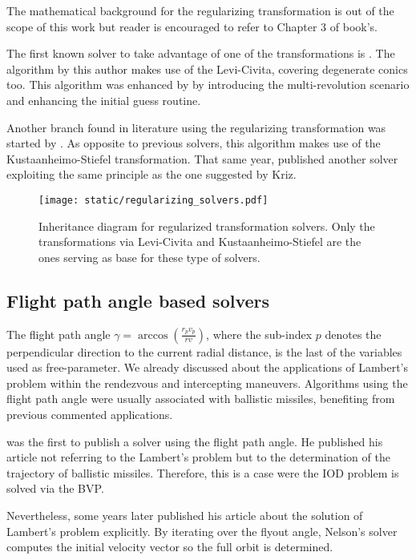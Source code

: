 The mathematical background for the regularizing transformation is out of the
scope of this work but reader is encouraged to refer to Chapter 3 of
\cite{celletti2002} book's.

The first known solver to take advantage of one of the transformations is
\cite{simo1973}. The algorithm by this author makes use of the Levi-Civita,
covering degenerate conics too. This algorithm was enhanced by \cite{torre2018}
by introducing the multi-revolution scenario and enhancing the initial guess routine.

Another branch found in literature using the regularizing transformation was
started by \cite{kriz1976}. As opposite to previous solvers, this algorithm
makes use of the Kustaanheimo-Stiefel transformation. That same year,
\cite{jezewski1976} published another solver exploiting the same principle as
the one suggested by Kriz.

\vspace{0.5cm}
\begin{figure}[h]
  \centering
  \texttt{[image: static/regularizing\_solvers.pdf]}
  \caption[Regularized transformation based solvers]{Inheritance diagram for regularized transformation solvers. Only the
    transformations via Levi-Civita and Kustaanheimo-Stiefel are the ones serving
    as base for these type of solvers.}
  \label{fig:regularizing_solvers}
\end{figure}


\subsection{Flight path angle based solvers}

The flight path angle $\gamma = \arccos{\left(\frac{r_p v_p}{r v} \right)}$,
where the sub-index $p$ denotes the perpendicular direction to the current radial
distance, is the last of the variables used as free-parameter. We already
discussed about the applications of Lambert's problem within the rendezvous and
intercepting maneuvers. Algorithms using the flight path angle were usually
associated with ballistic missiles, benefiting from previous commented
applications.

\cite{wheelon1959} was the first to publish a solver using the flight path
angle. He published his article not referring to the Lambert's problem but to
the determination of the trajectory of ballistic missiles. Therefore, this is a
case were the IOD problem is solved via the BVP.

Nevertheless, some years later \cite{nelson1992} published his article about the
solution of Lambert's problem explicitly. By iterating over the flyout angle,
Nelson's solver computes the initial velocity vector so the full orbit is
determined.


